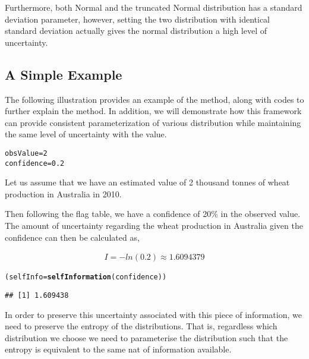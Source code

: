 \documentclass[nojss]{jss}\usepackage[]{graphicx}\usepackage[]{color}
\makeatletter
\newcommand{\hlnum}[1]{\textcolor[rgb]{0.686,0.059,0.569}{#1}}%
\newcommand{\hlstd}[1]{\textcolor[rgb]{0.345,0.345,0.345}{#1}}%
\newcommand{\hlkwb}[1]{\textcolor[rgb]{0.69,0.353,0.396}{#1}}%
\newcommand{\hlkwd}[1]{\textcolor[rgb]{0.737,0.353,0.396}{\textbf{#1}}}%
\newenvironment{kframe}{%
 \def\at@end@of@kframe{}%
 \ifinner\ifhmode%
  \def\at@end@of@kframe{\end{minipage}}%
  \begin{minipage}{\columnwidth}%
 \fi\fi%
 \def\FrameCommand##1{\hskip\@totalleftmargin \hskip-\fboxsep
 \colorbox{shadecolor}{##1}\hskip-\fboxsep
     \hskip-\linewidth \hskip-\@totalleftmargin \hskip\columnwidth}%
 \MakeFramed {\advance\hsize-\width
   \@totalleftmargin\z@ \linewidth\hsize
   \@setminipage}}%
 {\par\unskip\endMakeFramed%
 \at@end@of@kframe}
\newenvironment{knitrout}{}{} %
\makeatother
\begin{document}
Furthermore, both Normal and the truncated Normal distribution has a
standard deviation parameter, however, setting the two distribution
with identical standard deviation actually gives the normal
distribution a high level of uncertainty.

\subsection{A Simple Example}

The following illustration provides an example of the method, along
with codes to further explain the method. In addition, we will
demonstrate how this framework can provide consistent parameterization
of various distribution while maintaining the same level of
uncertainty with the value. 


\begin{knitrout}
\color{fgcolor}\begin{kframe}
\begin{alltt}
\hlstd{obsValue} \hlkwb{=} \hlnum{2}
\hlstd{confidence} \hlkwb{=} \hlnum{0.2}
\end{alltt}
\end{kframe}
\end{knitrout}

Let us assume that we have an estimated value of 2
thousand tonnes of wheat production in Australia in 2010.


Then following the flag table, we have a confidence of
20\% in the observed value. The amount of
uncertainty regarding the wheat production in Australia given the
confidence can then be calculated as,

\begin{align}
  I = -ln(0.2) \approx 1.6094379 \nonumber
\end{align}

\begin{knitrout}
\color{fgcolor}\begin{kframe}
\begin{alltt}
\hlstd{(selfInfo} \hlkwb{=} \hlkwd{selfInformation}\hlstd{(confidence))}
\end{alltt}
\begin{verbatim}
## [1] 1.609438
\end{verbatim}
\end{kframe}
\end{knitrout}

In order to preserve this uncertainty associated with this piece of
information, we need to preserve the entropy of the
distributions. That is, regardless which distribution we choose we
need to parameterise the distribution such that the entropy is
equivalent to the same nat of information available.
\end{document}
